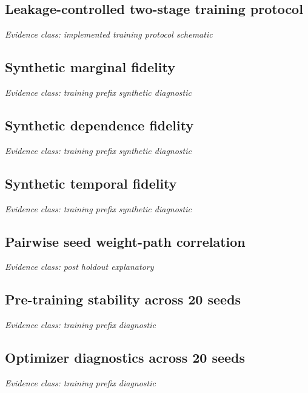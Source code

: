 \documentclass[11pt,a4paper]{article}
\begin{document}
\subsection*{Leakage-controlled two-stage training protocol}
\noindent\textit{Evidence class: implemented training protocol schematic}\par\medskip
\begin{center}

\end{center}
\clearpage
\subsection*{Synthetic marginal fidelity}
\noindent\textit{Evidence class: training prefix synthetic diagnostic}\par\medskip
\begin{center}

\end{center}
\clearpage
\subsection*{Synthetic dependence fidelity}
\noindent\textit{Evidence class: training prefix synthetic diagnostic}\par\medskip
\begin{center}

\end{center}
\clearpage
\subsection*{Synthetic temporal fidelity}
\noindent\textit{Evidence class: training prefix synthetic diagnostic}\par\medskip
\begin{center}

\end{center}
\clearpage
\subsection*{Pairwise seed weight-path correlation}
\noindent\textit{Evidence class: post holdout explanatory}\par\medskip
\begin{center}

\end{center}
\clearpage
\subsection*{Pre-training stability across 20 seeds}
\noindent\textit{Evidence class: training prefix diagnostic}\par\medskip
\begin{center}

\end{center}
\clearpage
\subsection*{Optimizer diagnostics across 20 seeds}
\noindent\textit{Evidence class: training prefix diagnostic}\par\medskip
\begin{center}

\end{center}
\end{document}
